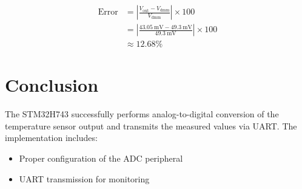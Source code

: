 \documentclass[12pt,a4paper]{article}
\begin{document}
\begin{align*}
    \text{Error} & = \left|\frac{V_{\text{out}} - V_{\text{dmm}}}{V_{\text{dmm}}}\right| \times 100 \\
    & = \left|\frac{\SI{43.05}{\milli\volt} - \SI{49.3}{\milli\volt}}{\SI{49.3}{\milli\volt}}\right| \times 100 \\
    & \approx 12.68 \%
\end{align*}


\section{Conclusion}
The STM32H743 successfully performs analog-to-digital conversion of the temperature sensor output and transmits the measured values via UART. The implementation includes:
\begin{itemize}
    \item Proper configuration of the ADC peripheral
    \item UART transmission for monitoring
\end{itemize}

\newpage


\end{document}
